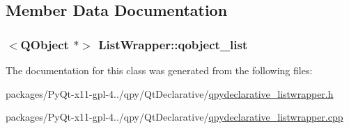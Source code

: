 \subsection{Member Data Documentation}
\hypertarget{classListWrapper_a7420a79cacc271c9e65bd6fc1a5de39b}{}
\subsubsection[{qobject\+\_\+list}]{$<$Q\+Object $\ast$$>$ List\+Wrapper\+::qobject\+\_\+list}\label{classListWrapper_a7420a79cacc271c9e65bd6fc1a5de39b}


The documentation for this class was generated from the following files\+:\begin{DoxyCompactItemize}
\item 
packages/\+Py\+Qt-\/x11-\/gpl-\/4../qpy/\+Qt\+Declarative/\hyperlink{qpydeclarative__listwrapper_8h}{qpydeclarative\+\_\+listwrapper.\+h}\item 
packages/\+Py\+Qt-\/x11-\/gpl-\/4../qpy/\+Qt\+Declarative/\hyperlink{qpydeclarative__listwrapper_8cpp}{qpydeclarative\+\_\+listwrapper.\+cpp}\end{DoxyCompactItemize}
